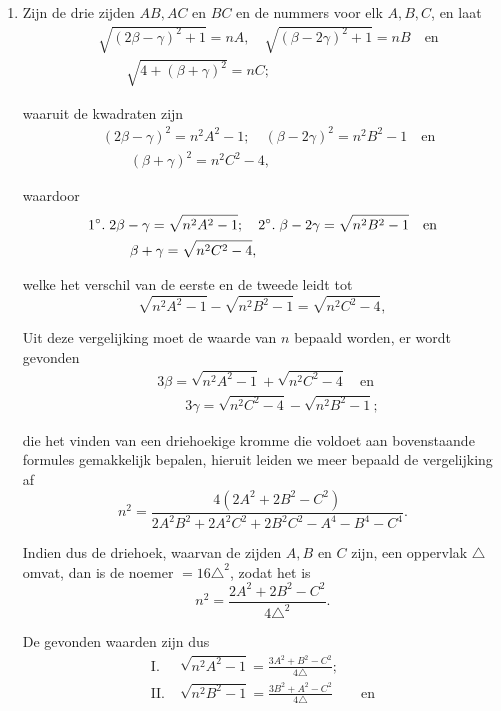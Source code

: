 \documentclass[10pt,a4paper]{article}
\newcommand{\switchenum}{\setcounter{enumi}{\arabic{enumi}-1}\switchcolumn}
\begin{document}
\begin{paracol}{2}
\begin{enumerate}[topsep=1px]
		\switchenum
		\item Zijn de drie zijden $AB, AC$ en $BC$ en de nummers voor elk $A, B, C$, en laat
		\begin{align*}
			&\sqrt{(2\beta - \gamma)^2+1} = nA, \quad \sqrt{(\beta-2\gamma)^2+1} = nB \quad \text{en}\\
			&\qquad \sqrt{4+(\beta + \gamma)^2}= nC;
		\end{align*}
		\par waaruit de kwadraten zijn
		\begin{align*}
			&(2\beta- \gamma)^2 = n^2A^2 - 1; \quad (\beta-2\gamma )^2= n^2B^2-1\quad \text{en}\\
			&\qquad (\beta+\gamma)^2= n^2C^2-4,
		\end{align*}
		\par waardoor
		\begin{align*}
			&\text{1}\degree.\; 2\beta - \gamma = \sqrt{n^2A^2-1}; \quad \text{2}\degree.\; \beta - 2\gamma = \sqrt{n^2B^2-1}\quad \text{en}\\
			&\qquad \quad \beta + \gamma = \sqrt{n^2C^2-4},
		\end{align*}
		\par welke het verschil van de eerste en de tweede leidt tot
		\[
			\sqrt{n^2A^2-1}-\sqrt{n^2B^2-1} = \sqrt{n^2C^2-4},
		\]
		\par Uit deze vergelijking moet de waarde van $n$ bepaald worden, er wordt gevonden
		\begin{align*}
			&3\beta = \sqrt{n^2A^2-1}+\sqrt{n^2C^2-4} \quad \text{en}\\
			&\qquad 3\gamma = \sqrt{n^2C^2-4}-\sqrt{n^2B^2-1};
		\end{align*}
		\par die het vinden van een driehoekige kromme die voldoet aan bovenstaande formules gemakkelijk bepalen, hieruit leiden we meer bepaald de vergelijking af
		\[
			n^2 = \frac{4(2A^2+2B^2-C^2)}{2A^2B^2+2A^2C^2+2B^2C^2-A^4-B^4-C^4}.
		\]
		\par Indien dus de driehoek, waarvan de zijden $A, B$ en $C$ zijn, een oppervlak $\triangle$ omvat, dan is de noemer $=16\triangle^2$, zodat het is 
		\[
			n^2 = \frac{2A^2+2B^2-C^2}{4 \triangle^2}.
		\]
		\par De gevonden waarden zijn dus
		\begin{align*}
			\text{I}. \;& \sqrt{n^2A^2-1} = \frac{3A^2+B^2-C^2}{4\triangle};\\
			\text{II}. \; & \sqrt{n^2B^2-1} = \frac{3B^2+A^2-C^2}{4\triangle} \qquad \text{en}\\

\end{align*}
\end{enumerate}
\end{paracol}
\end{document}
